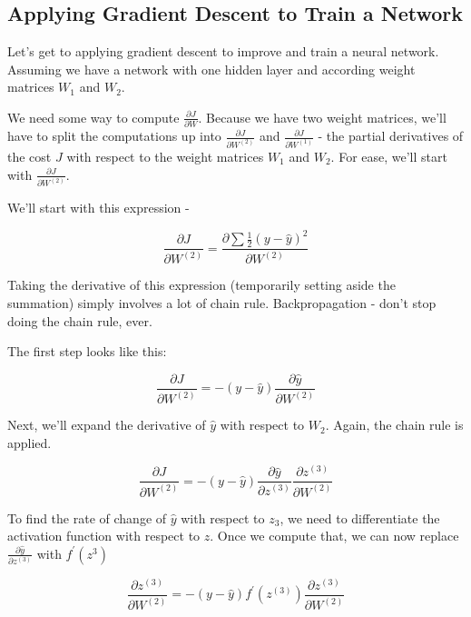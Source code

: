 \documentclass[]{article}
\begin{document}
\subsection{Applying Gradient Descent to Train a Network}
Let's get to applying gradient descent to improve and train a neural network. Assuming we have a network with one hidden layer and according weight matrices $W_1$ and $W_2$. 

We need some way to compute $\frac{\partial J}{\partial W}$. Because we have two weight matrices, we'll have to split the computations up into $\frac{\partial J}{\partial W^{(2)}}$ and $\frac{\partial J}{\partial W^{(1)}}$ - the partial derivatives of the cost $J$ with respect to the weight matrices $W_1$ and $W_2$. For ease, we'll start with $\frac{\partial J}{\partial W^{(2)}}$. 

We'll start with this expression - 

\begin{equation}
	\frac{\partial J}{\partial W^{(2)}} = \frac{\partial \sum \frac{1}{2}(y-\hat{y})^2}{\partial W^{(2)}}
\end{equation}

Taking the derivative of this expression (temporarily setting aside the summation) simply involves a lot of chain rule. Backpropagation - don't stop doing the chain rule, ever. 

The first step looks like this:

\begin{equation}
\frac{\partial J}{\partial W^{(2)}} = -(y-\hat{y}) \frac{\partial \hat{y}}{\partial W^{(2)}}
\end{equation}

Next, we'll expand the derivative of $\hat{y}$ with respect to $W_2$. Again, the chain rule is applied.

\begin{equation}
\frac{\partial J}{\partial W^{(2)}} = 
-(y-\hat{y})
\frac{\partial \hat{y}}{\partial z^{(3)}}  
\frac{\partial z^{(3)}}{\partial W^{(2)}}
\end{equation}

To find the rate of change of $\hat{y}$ with respect to $z_3$, we need to differentiate the activation function with respect to $z$. Once we compute that, we can now replace $\frac{\partial \hat{y}}{\partial z^{(3)}}$ with $f^\prime(z^{3})$

\begin{equation}
\frac{\partial z^{(3)}}{\partial W^{(2)}}= 
-(y-\hat{y}) f^\prime(z^{(3)}) \frac{\partial z^{(3)}}{\partial W^{(2)}}
\end{equation}
\end{document}
